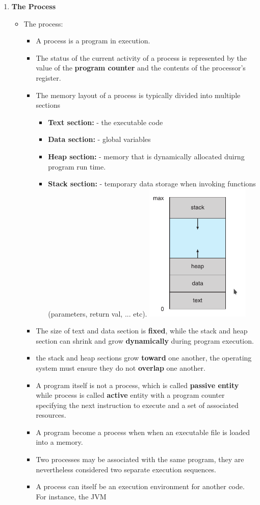 \documentclass[10pt]{article}
\begin{document}
\begin{enumerate}
	\item \textbf{The Process}
	\begin{itemize}
		\item The process:
		\begin{itemize}
			\item A process is a program in execution.
			\item The status of the current activity of a process is represented by the value of the \textbf{program counter} and the contents of the processor's register. 
			\item The memory layout of a process is typically divided into multiple sections
			\begin{itemize}
				\item \textbf{Text section:} - the executable code 
				\item \textbf{Data section:} - global variables
				\item \textbf{Heap section:} - memory that is dynamically allocated duirng program run time.
				\item \textbf{Stack section:} - temporary data storage when invoking functions (parameters, return val, ... etc).
				\includegraphics[width=5cm]{memory_layout.png}
				\bigbreak
			\end{itemize}

			\item The size of text and data section is \textbf{fixed}, while the stack and heap section can shrink and grow \textbf{dynamically} during program execution.
			\item the stack and heap sections grow \textbf{toward} one another, the operating system must ensure they do not \textbf{overlap} one another.
			\item A program itself is not a process, which is called \textbf{passive entity} while process is called \textbf{active} entity with a program counter specifying the next instruction to execute and a set of associated resources.
			\item A program become a process when when an executable file is loaded into a memory.
			\item Two processes may be associated with the same program, they are nevertheless considered two separate execution sequences.
			\item A process can itself be an execution environment for another code. For instance, the JVM   
		\end{itemize}
	\end{itemize}


\end{enumerate}
\end{document}
